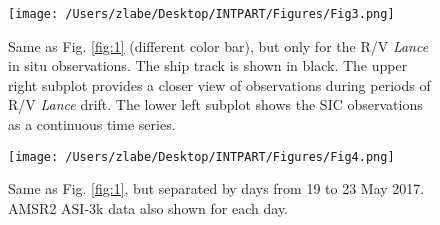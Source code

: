 \documentclass[draft,linenumbers]{agujournal}
\begin{document}
\begin{figure}
\texttt{[image: /Users/zlabe/Desktop/INTPART/Figures/Fig3.png]}\\
\caption{Same as Fig. \ref{fig:1} (different color bar), but only for the R/V \textit{Lance} in situ observations. The ship track is shown in black. The upper right subplot provides a closer view of observations during periods of R/V \textit{Lance} drift. The lower left subplot shows the SIC observations as a continuous time series.}\label{fig:3}
\end{figure}

\begin{figure}
\texttt{[image: /Users/zlabe/Desktop/INTPART/Figures/Fig4.png]}\\
\caption{Same as Fig. \ref{fig:1}, but separated by days from 19 to 23 May 2017. AMSR2 ASI-3k data also shown for each day.}\label{fig:4}
\end{figure}
\end{document}
